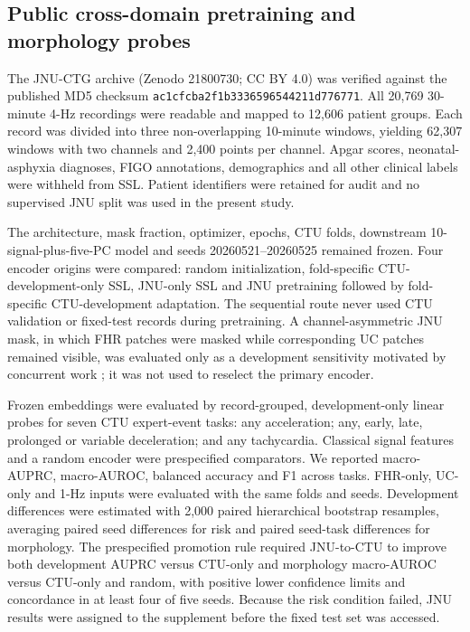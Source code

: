 \documentclass[utf8]{FrontiersinHarvard}
\begin{document}
\subsection{Public cross-domain pretraining and morphology probes}

The JNU-CTG archive (Zenodo 21800730; CC BY 4.0) was verified against the published MD5 checksum \texttt{ac1cfcba2f1b3336596544211d776771}. All 20,769 30-minute 4-Hz recordings were readable and mapped to 12,606 patient groups. Each record was divided into three non-overlapping 10-minute windows, yielding 62,307 windows with two channels and 2,400 points per channel. Apgar scores, neonatal-asphyxia diagnoses, FIGO annotations, demographics and all other clinical labels were withheld from SSL. Patient identifiers were retained for audit and no supervised JNU split was used in the present study.

The architecture, mask fraction, optimizer, epochs, CTU folds, downstream 10-signal-plus-five-PC model and seeds 20260521--20260525 remained frozen. Four encoder origins were compared: random initialization, fold-specific CTU-development-only SSL, JNU-only SSL and JNU pretraining followed by fold-specific CTU-development adaptation. The sequential route never used CTU validation or fixed-test records during pretraining. A channel-asymmetric JNU mask, in which FHR patches were masked while corresponding UC patches remained visible, was evaluated only as a development sensitivity motivated by concurrent work \citep{fridman2026ctgfoundation}; it was not used to reselect the primary encoder.

Frozen embeddings were evaluated by record-grouped, development-only linear probes for seven CTU expert-event tasks: any acceleration; any, early, late, prolonged or variable deceleration; and any tachycardia. Classical signal features and a random encoder were prespecified comparators. We reported macro-AUPRC, macro-AUROC, balanced accuracy and F1 across tasks. FHR-only, UC-only and 1-Hz inputs were evaluated with the same folds and seeds. Development differences were estimated with 2,000 paired hierarchical bootstrap resamples, averaging paired seed differences for risk and paired seed-task differences for morphology. The prespecified promotion rule required JNU-to-CTU to improve both development AUPRC versus CTU-only and morphology macro-AUROC versus CTU-only and random, with positive lower confidence limits and concordance in at least four of five seeds. Because the risk condition failed, JNU results were assigned to the supplement before the fixed test set was accessed.
\end{document}
